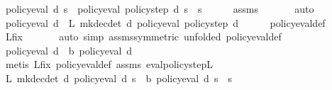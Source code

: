 \begin{isabellebody}
\ {\isachardoublequoteopen}policy{\isacharunderscore}{\kern0pt}eval\ d\ s\ {\isacharequal}{\kern0pt}\ policy{\isacharunderscore}{\kern0pt}eval\ {\isacharparenleft}{\kern0pt}policy{\isacharunderscore}{\kern0pt}step\ d{\isacharparenright}{\kern0pt}\ s{\isachardoublequoteclose}\ \ s\isanewline
\ \ \ \ \isamarkupfalse%
\ assms\ \isanewline
\ \ \ \ \isamarkupfalse%
\ auto\isanewline
\ \ \isamarkupfalse%
\ {\isachardoublequoteopen}policy{\isacharunderscore}{\kern0pt}eval\ d\ {\isacharequal}{\kern0pt}\ L\ {\isacharparenleft}{\kern0pt}mk{\isacharunderscore}{\kern0pt}dec{\isacharunderscore}{\kern0pt}det\ d{\isacharparenright}{\kern0pt}\ {\isacharparenleft}{\kern0pt}policy{\isacharunderscore}{\kern0pt}eval\ {\isacharparenleft}{\kern0pt}policy{\isacharunderscore}{\kern0pt}step\ d{\isacharparenright}{\kern0pt}{\isacharparenright}{\kern0pt}{\isachardoublequoteclose}\isanewline
\ \ \ \ \isamarkupfalse%
\ policy{\isacharunderscore}{\kern0pt}eval{\isacharunderscore}{\kern0pt}def\isanewline
\ \ \ \ \isamarkupfalse%
\ L{\isacharunderscore}{\kern0pt}{\isasymnu}{\isacharunderscore}{\kern0pt}fix\ \isanewline
\ \ \ \ \isamarkupfalse%
\ {\isacharparenleft}{\kern0pt}auto\ simp{\isacharcolon}{\kern0pt}\ assms{\isacharparenleft}{\kern0pt}{}{\isacharparenright}{\kern0pt}{\isacharbrackleft}{\kern0pt}symmetric{\isacharcomma}{\kern0pt}\ unfolded\ policy{\isacharunderscore}{\kern0pt}eval{\isacharunderscore}{\kern0pt}def{\isacharbrackright}{\kern0pt}{\isacharparenright}{\kern0pt}\isanewline
\ \ \isamarkupfalse%
\ {\isachardoublequoteopen}policy{\isacharunderscore}{\kern0pt}eval\ d\ {\isacharequal}{\kern0pt}\ {\isasymL}\isactrlsub b\ {\isacharparenleft}{\kern0pt}policy{\isacharunderscore}{\kern0pt}eval\ d{\isacharparenright}{\kern0pt}{\isachardoublequoteclose}\isanewline
\ \ \ \ \isamarkupfalse%
\ {\isacharparenleft}{\kern0pt}metis\ L{\isacharunderscore}{\kern0pt}{\isasymnu}{\isacharunderscore}{\kern0pt}fix\ policy{\isacharunderscore}{\kern0pt}eval{\isacharunderscore}{\kern0pt}def\ assms\ eval{\isacharunderscore}{\kern0pt}policy{\isacharunderscore}{\kern0pt}step{\isacharunderscore}{\kern0pt}L{\isacharparenright}{\kern0pt}\isanewline
\ \ \isamarkupfalse%
\ {\isachardoublequoteopen}L\ {\isacharparenleft}{\kern0pt}mk{\isacharunderscore}{\kern0pt}dec{\isacharunderscore}{\kern0pt}det\ d{\isacharparenright}{\kern0pt}\ {\isacharparenleft}{\kern0pt}policy{\isacharunderscore}{\kern0pt}eval\ d{\isacharparenright}{\kern0pt}\ s\ {\isacharequal}{\kern0pt}\ {\isasymL}\isactrlsub b\ {\isacharparenleft}{\kern0pt}policy{\isacharunderscore}{\kern0pt}eval\ d{\isacharparenright}{\kern0pt}\ s{\isachardoublequoteclose}\ \ s\isanewline

\end{isabellebody}
